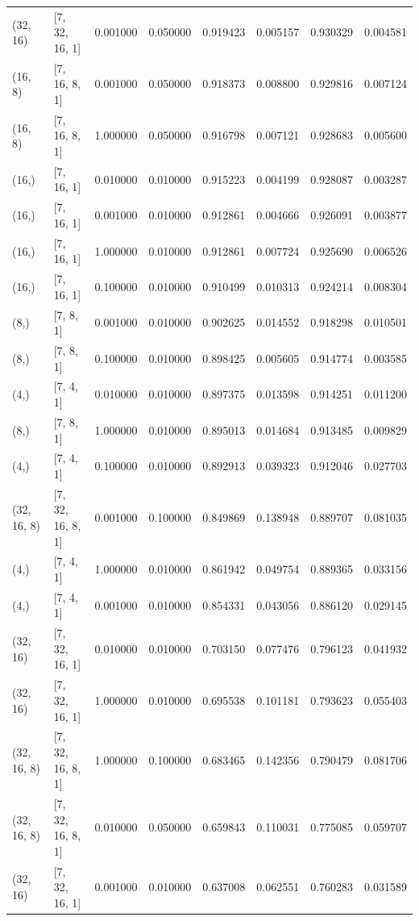 \documentclass{article}
\begin{document}
\begin{longtable}{llrrrrrr}
(32, 16) & [7, 32, 16, 1] & 0.001000 & 0.050000 & 0.919423 & 0.005157 & 0.930329 & 0.004581 \\
(16, 8) & [7, 16, 8, 1] & 0.001000 & 0.050000 & 0.918373 & 0.008800 & 0.929816 & 0.007124 \\
(16, 8) & [7, 16, 8, 1] & 1.000000 & 0.050000 & 0.916798 & 0.007121 & 0.928683 & 0.005600 \\
(16,) & [7, 16, 1] & 0.010000 & 0.010000 & 0.915223 & 0.004199 & 0.928087 & 0.003287 \\
(16,) & [7, 16, 1] & 0.001000 & 0.010000 & 0.912861 & 0.004666 & 0.926091 & 0.003877 \\
(16,) & [7, 16, 1] & 1.000000 & 0.010000 & 0.912861 & 0.007724 & 0.925690 & 0.006526 \\
(16,) & [7, 16, 1] & 0.100000 & 0.010000 & 0.910499 & 0.010313 & 0.924214 & 0.008304 \\
(8,) & [7, 8, 1] & 0.001000 & 0.010000 & 0.902625 & 0.014552 & 0.918298 & 0.010501 \\
(8,) & [7, 8, 1] & 0.100000 & 0.010000 & 0.898425 & 0.005605 & 0.914774 & 0.003585 \\
(4,) & [7, 4, 1] & 0.010000 & 0.010000 & 0.897375 & 0.013598 & 0.914251 & 0.011200 \\
(8,) & [7, 8, 1] & 1.000000 & 0.010000 & 0.895013 & 0.014684 & 0.913485 & 0.009829 \\
(4,) & [7, 4, 1] & 0.100000 & 0.010000 & 0.892913 & 0.039323 & 0.912046 & 0.027703 \\
(32, 16, 8) & [7, 32, 16, 8, 1] & 0.001000 & 0.100000 & 0.849869 & 0.138948 & 0.889707 & 0.081035 \\
(4,) & [7, 4, 1] & 1.000000 & 0.010000 & 0.861942 & 0.049754 & 0.889365 & 0.033156 \\
(4,) & [7, 4, 1] & 0.001000 & 0.010000 & 0.854331 & 0.043056 & 0.886120 & 0.029145 \\
(32, 16) & [7, 32, 16, 1] & 0.010000 & 0.010000 & 0.703150 & 0.077476 & 0.796123 & 0.041932 \\
(32, 16) & [7, 32, 16, 1] & 1.000000 & 0.010000 & 0.695538 & 0.101181 & 0.793623 & 0.055403 \\
(32, 16, 8) & [7, 32, 16, 8, 1] & 1.000000 & 0.100000 & 0.683465 & 0.142356 & 0.790479 & 0.081706 \\
(32, 16, 8) & [7, 32, 16, 8, 1] & 0.010000 & 0.050000 & 0.659843 & 0.110031 & 0.775085 & 0.059707 \\
(32, 16) & [7, 32, 16, 1] & 0.001000 & 0.010000 & 0.637008 & 0.062551 & 0.760283 & 0.031589 \\

\end{longtable}
\end{document}
